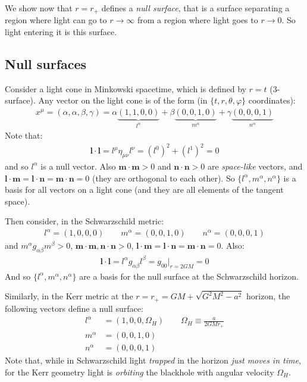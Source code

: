 \documentclass[../template.tex]{subfiles}
\begin{document}
We show now that $r = r_+$ defines a \textit{null surface}, that is a surface separating a region where light can go to $r \to \infty$ from a region where light goes to $r \to 0$. So light entering it is  this surface. 

\subsection{Null surfaces}
Consider a light cone in Minkowski spacetime, which is defined by $r=t$ ($3$-surface). Any vector on the light cone is of the form (in $\{t,r,\theta,\varphi\}$ coordinates):
\begin{align*}
    x^\mu = (\alpha, \alpha, \beta, \gamma) = \alpha\underbrace{(1,1,0,0)}_{l^\alpha}  + \beta\underbrace{(0,0,1,0)}_{m^\alpha}  + \gamma\underbrace{(0,0,0,1)}_{n^\alpha} 
\end{align*}   
Note that:
\begin{align*}
    \bm{l}\cdot \bm{l} = l^\mu \eta_{\mu \nu}l^\nu = (l^0)^2 + (l^1)^2 = 0
\end{align*}
and so $l^\alpha$ is a null vector. Also $\bm{m}\cdot \bm{m} >0$ and $\bm{n}\cdot \bm{n} >0$ are \textit{space-like} vectors, and $\bm{l}\cdot \bm{m} = \bm{l} \cdot \bm{n} = \bm{m} \cdot \bm{n} = 0$ (they are orthogonal to each other). So $\{l^\alpha, m^\alpha, n^\alpha\}$ is a basis for all vectors on a light cone (and they are all elements of the tangent space).

Then consider, in the Schwarzschild metric:
\begin{align*}
    l^\alpha = (1,0,0,0) \qquad m^\alpha = (0,0,1,0) \qquad n^\alpha = (0,0,0,1)
\end{align*}
and $m^\alpha g_{\alpha \beta} m^\beta >0$, $\bm{m}\cdot \bm{m}, \bm{n}\cdot \bm{n} > 0$, $\bm{l}\cdot \bm{m} = \bm{l} \cdot \bm{n} = \bm{m} \cdot \bm{n} = 0$. Also:
\begin{align*}
    \bm{l}\cdot \bm{l} = l^\alpha g_{\alpha \beta} l^\beta = g_{00} \Big|_{r=2GM} = 0
\end{align*}
And so $\{l^\alpha, m^\alpha, n^\alpha\}$ are a basis for the null surface at the Schwarzschild horizon.

Similarly, in the Kerr metric at the $r= r_+ = GM + \sqrt{G^2 M^2 - a^2}$ horizon, the following vectors define a null surface:
\begin{align*}
    l^\alpha &= (1,0,0, \Omega_H) \qquad \Omega_H \equiv \frac{a}{2GMr_+} \\
    m^\alpha &= (0,0,1,0)\\
    n^\alpha &= (0,0,0,1)
\end{align*} 
Note that, while in Schwarzschild light \textit{trapped} in the horizon \textit{just moves in time}, for the Kerr geometry light is \textit{orbiting} the blackhole with angular velocity $\Omega_H$.
\end{document}
